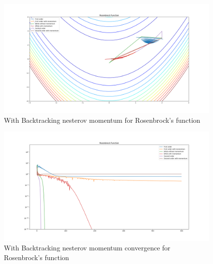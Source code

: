 \documentclass{article}
\begin{document}
\begin{center}
\begin{figure}[H]
	\includegraphics[width=\linewidth]{../Images/rosenbrockbacktrack.png}
	\caption{With Backtracking nesterov momentum for Rosenbrock's function}
	\label{fig:With Backtracking nesterov momentum for Rosenbrock's function}
\end{figure}

\begin{figure}[H]
	\includegraphics[width=\linewidth]{../Images/rosenbrockbacktrack1.png}
	\caption{With Backtracking nesterov momentum convergence for Rosenbrock's function}
	\label{fig:With Backtracking nesterov momentum convergence for Rosenbrock's function}
\end{figure}
\end{center}
\end{document}
